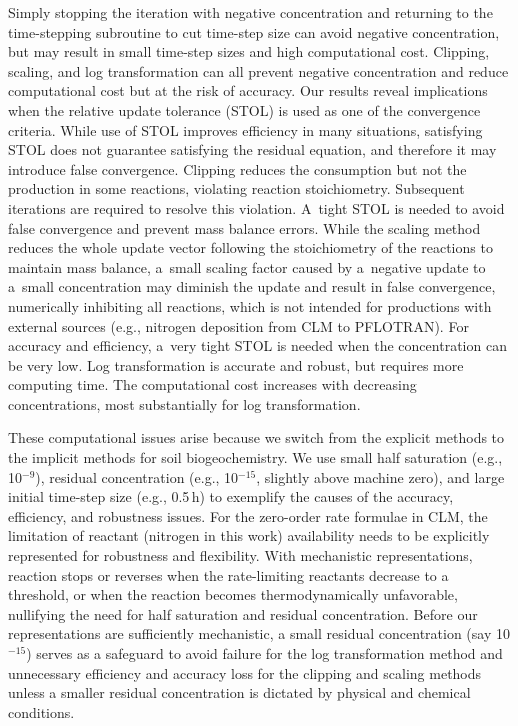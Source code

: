 \documentclass[gmd,noline]{copernicus}
\begin{document}
      Simply stopping the iteration with negative concentration and
      returning to the time-stepping subroutine to cut time-step size can
      avoid negative concentration, but may result in small time-step sizes
      and high computational cost. Clipping, scaling, and log transformation
      can all prevent negative concentration and reduce computational
      cost but at the risk of accuracy. Our results reveal implications when the relative update
      tolerance (STOL) is used as one of the convergence criteria. While use
      of STOL improves efficiency in many situations, satisfying STOL does
      not guarantee satisfying the residual equation, and therefore it may
      introduce false convergence. Clipping reduces the consumption but not
      the production in some reactions, violating reaction
      stoichiometry. Subsequent iterations are required to resolve this
      violation. A~tight STOL is needed to avoid false convergence and
      prevent mass balance errors. While the scaling method reduces the
      whole update vector following the stoichiometry of the reactions to
      maintain mass balance, a~small scaling factor caused by a~negative
      update to a~small concentration may diminish the update and result in
      false convergence, numerically inhibiting all reactions, which is not
      intended for productions with external sources (e.g., nitrogen
      deposition from CLM to PFLOTRAN). For accuracy and efficiency, a~very
      tight STOL is needed when the concentration can be very low. Log
      transformation is accurate and robust, but requires more computing
      time. The computational cost increases with decreasing concentrations,
      most substantially for log transformation.

      These computational issues arise because we switch from the explicit
methods to the implicit methods for soil biogeochemistry. We use small half
saturation (e.g., 10$^{-9}$), residual concentration (e.g., 10$^{-15}$,
slightly above machine zero), and large initial time-step size (e.g., 0.5\,h)
to exemplify the causes of the accuracy, efficiency, and robustness issues.
For the zero-order rate formulae in CLM, the limitation of reactant (nitrogen
in this work) availability needs to be explicitly represented for robustness
and flexibility. With mechanistic representations, reaction stops or reverses
when the rate-limiting reactants decrease to a threshold, or when the
reaction becomes thermodynamically unfavorable, nullifying the need for half
saturation and residual concentration. Before our representations are
sufficiently mechanistic, a small residual concentration (say 10$^{-15}$)
serves as a safeguard to avoid failure for the log transformation method and
unnecessary efficiency and accuracy loss for the clipping and scaling methods
unless a smaller residual concentration is dictated by physical and chemical
conditions.
\end{document}
